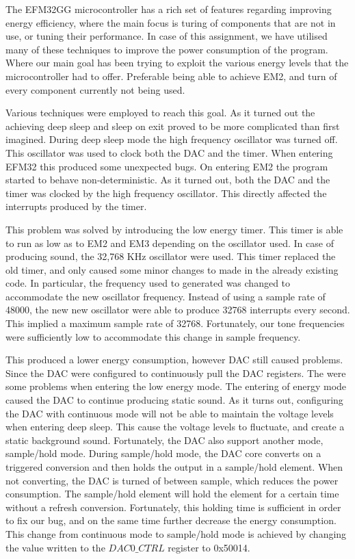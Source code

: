 The EFM32GG microcontroller has a rich set of features regarding improving energy efficiency, where the main focus is turing of components that are not in use, or tuning their performance. In case of this assignment, we have utilised many of these techniques to improve the power consumption of the program. Where our main goal has been trying to exploit the various energy levels that the microcontroller had to offer. Preferable being able to achieve EM2, and turn of every component currently not being used. 

Various techniques were employed to reach this goal. As it turned out the achieving deep sleep and sleep on exit proved to be more complicated than first imagined. During deep sleep mode the high frequency oscillator was turned off. This oscillator was used to clock both the DAC and the timer. When entering EFM32 this produced some unexpected bugs. On entering EM2 the program started to behave non-deterministic. As it turned out, both the DAC and the timer was clocked by the high frequency oscillator. This directly affected the interrupts produced by the timer.

This problem was solved by introducing the low energy timer. This timer is able to run as low as to EM2 and EM3 depending on the oscillator used. In case of producing sound, the 32,768 KHz oscillator were used. This timer replaced the old timer, and only caused some minor changes to made in the already existing code. In particular, the frequency used to generated was changed to accommodate the new oscillator frequency. Instead of  using a sample rate of 48000, the new 
new oscillator were able to produce 32768 interrupts every second. This implied a maximum sample rate of 32768. Fortunately, our tone frequencies were sufficiently low to accommodate this change in sample frequency. 


This produced a lower energy consumption, however DAC still caused problems. Since the DAC were configured to continuously pull the DAC registers. The were some problems when entering the low energy mode. The entering of energy mode caused the DAC to continue producing static sound. As it turns out, configuring the DAC with continuous mode will not be able to maintain the voltage levels when entering deep sleep. This cause the voltage levels to fluctuate, and create a static background sound. Fortunately, the DAC also support another mode, sample/hold mode. During sample/hold mode, the DAC core converts on a triggered conversion and then holds the output in a sample/hold element. When not converting, the DAC is turned of between sample, which reduces the power consumption. The sample/hold element will hold the element for a certain time without a refresh conversion\cite{EFM32GG-rm}. Fortunately, this holding time is sufficient in order to fix our bug, and on the same time further decrease the energy consumption. This change from continuous mode to sample/hold mode is achieved by changing the value written to the $DAC0\_CTRL$ register to 0x50014. 


